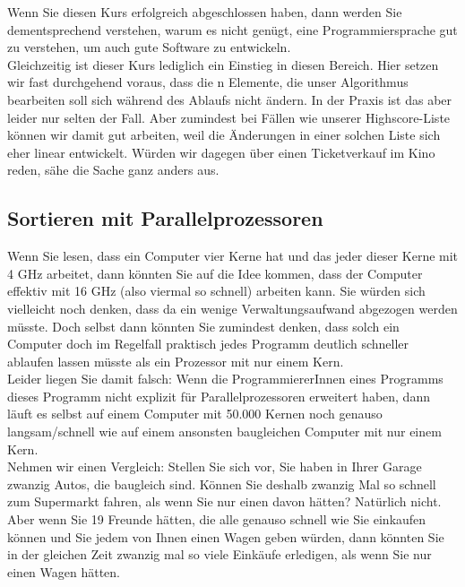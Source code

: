 Wenn Sie diesen Kurs erfolgreich abgeschlossen haben, dann werden Sie dementsprechend verstehen, warum es nicht genügt, eine Programmiersprache gut zu verstehen, um auch gute Software zu entwickeln.\\

Gleichzeitig ist dieser Kurs lediglich ein Einstieg in diesen Bereich. Hier setzen wir fast durchgehend voraus, dass die n Elemente, die unser Algorithmus bearbeiten soll sich während des Ablaufs nicht ändern. In der Praxis ist das aber leider nur selten der Fall. Aber zumindest bei Fällen wie unserer Highscore-Liste können wir damit gut arbeiten, weil die Änderungen in einer solchen Liste sich eher linear entwickelt. Würden wir dagegen über einen Ticketverkauf im Kino reden, sähe die Sache ganz anders aus.

\subsection{Sortieren mit Parallelprozessoren}

Wenn Sie lesen, dass ein Computer vier Kerne hat und das jeder dieser Kerne mit 4 GHz arbeitet, dann könnten Sie auf die Idee kommen, dass der Computer effektiv mit 16 GHz (also viermal so schnell) arbeiten kann. Sie würden sich vielleicht noch denken, dass da ein wenige Verwaltungsaufwand abgezogen werden müsste. Doch selbst dann könnten Sie zumindest denken, dass solch ein Computer doch im Regelfall praktisch jedes Programm deutlich schneller ablaufen lassen müsste als ein Prozessor mit nur einem Kern.\\

Leider liegen Sie damit falsch: Wenn die ProgrammiererInnen eines Programms dieses Programm nicht explizit für Parallelprozessoren erweitert haben, dann läuft es selbst auf einem Computer mit 50.000 Kernen noch genauso langsam/schnell wie auf einem ansonsten baugleichen Computer mit nur einem Kern.\\

Nehmen wir einen Vergleich: Stellen Sie sich vor, Sie haben in Ihrer Garage zwanzig Autos, die baugleich sind. Können Sie deshalb zwanzig Mal so schnell zum Supermarkt fahren, als wenn Sie nur einen davon hätten? Natürlich nicht. Aber wenn Sie 19 Freunde hätten, die alle genauso schnell wie Sie einkaufen können und Sie jedem von Ihnen einen Wagen geben würden, dann könnten Sie in der gleichen Zeit zwanzig mal so viele Einkäufe erledigen, als wenn Sie nur einen Wagen hätten.\\

